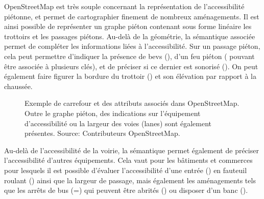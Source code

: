 
OpenStreetMap est très souple concernant la représentation de l'accessibilité piétonne, et permet de cartographier finement de nombreux aménagements. Il est ainsi possible de représenter un graphe piéton contenant sous forme linéaire les trottoirs et les passages piétons. Au-delà de la géométrie, la sémantique associée permet de compléter les informations liées à l'accessibilité. Sur un passage piéton, cela peut permettre d'indiquer la présence de \glspl{bev} (), d'un feu piéton ( pouvant être associée à plusieurs clés), et de préciser si ce dernier est sonorisé (). On peut également faire figurer la bordure du trottoir () et son élévation par rapport à la chaussée.

\begin{figure}[ht]
    \centering
    \caption[Anatomie d'un carrefour dans OpenStreetMap]{Exemple de carrefour et des attributs associés dans OpenStreetMap. Outre le graphe piéton, des indications sur l'équipement d'accessibilité ou la largeur des voies (lanes) sont également présentes. Source: Contributeurs OpenStreetMap.}
    \label{fig:modelisation_anatomie_carrefour_osm}
\end{figure}

Au-delà de l'accessibilité de la voirie, la sémantique permet également de préciser l'accessibilité d'autres équipements. Cela vaut pour les bâtiments et commerces pour lesquels il est possible d'évaluer l'accessibilité d'une entrée () en fauteuil roulant () ainsi que la largeur de passage, mais également les aménagements tels que les arrêts de bus (=) qui peuvent être abrités () ou disposer d'un banc ().

